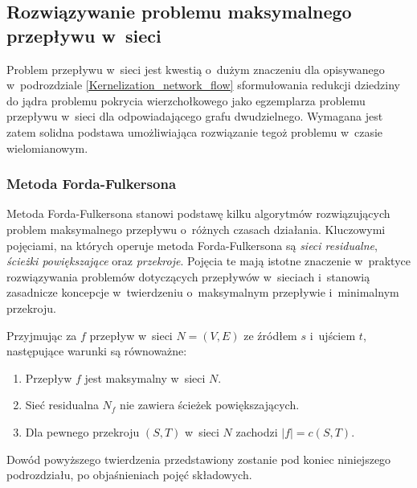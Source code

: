 \subsection{Rozwiązywanie problemu maksymalnego przepływu w~sieci}\label{ss_max_flow}
\par{
  Problem przepływu w~sieci jest kwestią o~dużym znaczeniu dla opisywanego w~podrozdziale \ref{Kernelization_network_flow} sformułowania redukcji dziedziny do jądra problemu pokrycia wierzchołkowego jako egzemplarza problemu przepływu w~sieci dla odpowiadającego grafu dwudzielnego. 
  Wymagana jest zatem solidna podstawa umożliwiająca rozwiązanie tegoż problemu w~czasie wielomianowym.
}
\subsubsection{\textbf{Metoda Forda-Fulkersona}}
\par{
  Metoda Forda-Fulkersona stanowi podstawę kilku algorytmów rozwiązujących problem maksymalnego przepływu o~różnych czasach działania.
  Kluczowymi pojęciami, na których operuje metoda Forda-Fulkersona są \emph{sieci residualne}, \emph{ścieżki powiększające} oraz \emph{przekroje}.
  Pojęcia te mają istotne znaczenie w~praktyce rozwiązywania problemów dotyczących przepływów w~sieciach i~stanowią zasadnicze koncepcje w~twierdzeniu o~maksymalnym przepływie i~minimalnym przekroju.
  \begin{theorem}
    Przyjmując za $f$ przepływ w~sieci $N=(V,E)$ ze źródłem $s$ i~ujściem $t$, następujące warunki są równoważne:
    \begin{enumerate}[(1)]
      \item Przepływ $f$ jest maksymalny w~sieci $N$.
      \item Sieć residualna $N_f$ nie zawiera ścieżek powiększających.
      \item Dla pewnego przekroju $(S, T)$ w~sieci $N$ zachodzi $|f|=c(S,T)$.
    \end{enumerate}
  \end{theorem}
  Dowód powyższego twierdzenia przedstawiony zostanie pod koniec niniejszego podrozdziału, po objaśnieniach pojęć składowych.
}
